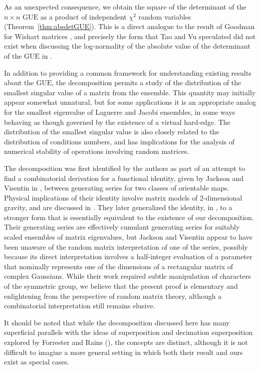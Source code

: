 \documentclass[pdftex, oneside, 10pt, letterpaper]{amsart}
\theoremstyle{plain}
\theoremstyle{definition}
\theoremstyle{remark}
\begin{document}
As an unexpected consequence, we obtain the square of the determinant
of the $n\times n$ {\ensuremath{\mathrm{GUE}}}{} as a product of independent $\chi^2$ random
variables (Theorem~\ref{thm:absdetGUE}).  This is a direct analogue to
the result of Goodman for Wishart matrices \cite{Goodman}, and
precisely the form that Tao and Vu speculated did not exist
when discussing the log-normality of the absolute value of the
determinant of the {\ensuremath{\mathrm{GUE}}}{} in \cite{TV}.

In addition to providing a common framework for understanding existing
results about the {\ensuremath{\mathrm{GUE}}}{}, the decomposition permits a study of the
distribution of the smallest singular value of a matrix from the
ensemble.  This quantity may initially appear somewhat unnatural, but
for some applications it is an appropriate analog for the smallest
eigenvalue of Laguerre and Jacobi ensembles, in some ways behaving as
though governed by the existence of a virtual hard-edge.  The
distribution of the smallest singular value is also closely related to
the distribution of conditions numbers, and has implications for the
analysis of numerical stability of operations involving random
matrices.

The decomposition was first identified by the authors as part of an
attempt to find a combinatorial derivation for a functional identity,
given by Jackson and Visentin in \cite{JV-Characters}, between
generating series for two classes of orientable maps.  Physical
implications of their identity involve matrix models of 2-dimensional
gravity, and are discussed in \cite{JPV}.  They later generalized the
identity, in \cite{JV-Eulerian}, to a stronger form that is essentially
equivalent to the existence of our decomposition.  Their generating
series are effectively cumulant generating series for suitably scaled
ensembles of matrix eigenvalues, but Jackson and Visentin appear to
have been unaware of the random matrix interpretation of one of the
series, possibly because its direct interpretation involves a
half-integer evaluation of a parameter that nominally represents one
of the dimensions of a rectangular matrix of complex Gaussians.  While
their work required subtle manipulation of characters of the symmetric
group, we believe that the present proof is elementary and
enlightening from the perspective of random matrix theory, although a
combinatorial interpretation still remains elusive.

It should be noted that while the decomposition discussed here has
many superficial parallels with the ideas of superposition and
decimation superposition explored by Forrester and Rains
(\cite{FoRa-OUS, FoRa-Decimation}), the concepts are distinct,
although it is not difficult to imagine a more general setting in
which both their result and ours exist as special cases.
\end{document}
